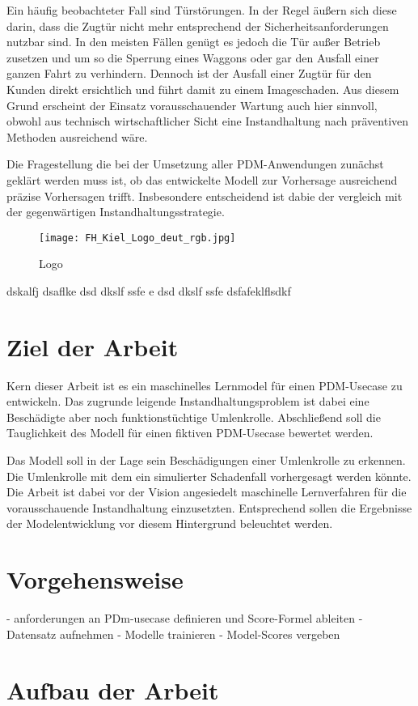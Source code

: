 Ein häufig beobachteter Fall sind Türstörungen. In der Regel äußern sich diese darin, dass die Zugtür nicht mehr entsprechend der Sicherheitsanforderungen nutzbar sind. In den meisten Fällen genügt es jedoch die Tür außer Betrieb zusetzen und um so die Sperrung eines Waggons oder gar den Ausfall einer ganzen Fahrt zu verhindern. Dennoch ist der Ausfall einer Zugtür für den Kunden direkt ersichtlich und führt damit zu einem Imageschaden. Aus diesem Grund erscheint der Einsatz vorausschauender Wartung auch hier sinnvoll, obwohl aus technisch wirtschaftlicher Sicht eine Instandhaltung nach präventiven Methoden ausreichend wäre. 

Die Fragestellung die bei der Umsetzung aller PDM-Anwendungen zunächst geklärt werden muss ist, ob das entwickelte Modell zur Vorhersage ausreichend präzise Vorhersagen trifft. Insbesondere entscheidend ist dabie der vergleich mit der gegenwärtigen Instandhaltungsstrategie.

\begin{figure}[ht]
	\centering
	\texttt{[image: FH\_Kiel\_Logo\_deut\_rgb.jpg]}
	\caption{Logo}
	\label{fig:fhlogo}
\end{figure}

dskalfj dsaflke dsd dkslf ssfe e dsd dkslf ssfe dsfafeklflsdkf
\section{Ziel der Arbeit}
\label{sec:ziel}
Kern dieser Arbeit ist es ein maschinelles Lernmodel für einen PDM-Usecase zu entwickeln. Das zugrunde leigende Instandhaltungsproblem ist dabei eine Beschädigte aber noch funktionstüchtige Umlenkrolle. Abschließend soll die Tauglichkeit des Modell für einen fiktiven PDM-Usecase bewertet werden. 



Das Modell soll in der Lage sein Beschädigungen einer Umlenkrolle zu erkennen. Die Umlenkrolle mit dem ein simulierter Schadenfall vorhergesagt werden könnte. Die Arbeit ist dabei vor der Vision angesiedelt maschinelle Lernverfahren für die vorausschauende Instandhaltung einzusetzten. Entsprechend sollen die Ergebnisse der Modelentwicklung vor diesem Hintergrund beleuchtet werden.

\section{Vorgehensweise}
\label{sec:vorgehensweise}
- anforderungen an PDm-usecase definieren und Score-Formel ableiten
- Datensatz aufnehmen
- Modelle trainieren
- Model-Scores vergeben 

\section{Aufbau der Arbeit}
\label{sec:gliederung}

\blindtext[2]

\blindtext[3]

\blindtext[5]

\blindtext[3]